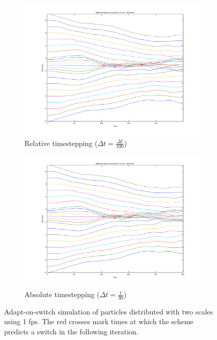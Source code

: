 \documentclass[11pt]{article}
\begin{document}
\begin{figure}[H]
    \begin{subfigure}{0.5\textwidth}
        \includegraphics[width=\textwidth]{../images/switch_multiscale_1fps_relative.png}
        \caption{Relative timestepping ($\Delta t = \frac{\Delta t}{100}$)}
        \label{fig:switch_multi_1fps_relative}
    \end{subfigure}
    \begin{subfigure}{0.5\textwidth}
        \includegraphics[width=\textwidth]{../images/switch_multiscale_1fps_absolute.png}
        \caption{Absolute timestepping ($\Delta t = \frac{1}{30}$)}
        \label{fig:switch_multi_1fps_absolute}
    \end{subfigure}
    \caption{Adapt-on-switch simulation of particles distributed with two
scales using 1 fps. The red crosses mark times at which the scheme predicts a
switch in the following iteration.}
    \label{fig:switch}
\end{figure}
\end{document}

